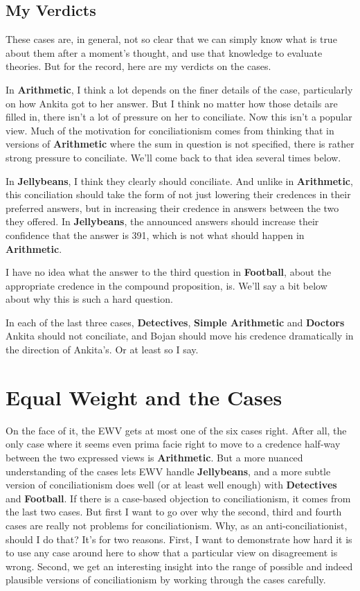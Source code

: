 \documentclass[
  10pt,
  letterpaper,
  twoside]{scrbook}
\begin{document}
\subsection{My Verdicts}\label{myverdicts}

These cases are, in general, not so clear that we can simply know what
is true about them after a moment's thought, and use that knowledge to
evaluate theories. But for the record, here are my verdicts on the
cases.

In \textbf{Arithmetic}, I think a lot depends on the finer details of
the case, particularly on how {Ankita} got to her answer. But I think no
matter how those details are filled in, there isn't a lot of pressure on
her to conciliate. Now this isn't a popular view. Much of the motivation
for conciliationism comes from thinking that in versions of
\textbf{Arithmetic} where the sum in question is not specified, there is
rather strong pressure to conciliate. We'll come back to that idea
several times below.

In \textbf{Jellybeans}, I think they clearly should conciliate. And
unlike in \textbf{Arithmetic}, this conciliation should take the form of
not just lowering their credences in their preferred answers, but in
increasing their credence in answers between the two they offered. In
\textbf{Jellybeans}, the announced answers should increase their
confidence that the answer is 391, which is not what should happen in
\textbf{Arithmetic}.

I have no idea what the answer to the third question in
\textbf{Football}, about the appropriate credence in the compound
proposition, is. We'll say a bit below about why this is such a hard
question.

In each of the last three cases, \textbf{Detectives}, \textbf{Simple
Arithmetic} and \textbf{Doctors} {Ankita} should not conciliate, and
{Bojan} should move his credence dramatically in the direction of
{Ankita}'s. Or at least so I say.

\section{Equal Weight and the Cases}\label{equalweightandthecases}

On the face of it, the EWV gets at most one of the six cases right.
After all, the only case where it seems even prima facie right to move
to a credence half-way between the two expressed views is
\textbf{Arithmetic}. But a more nuanced understanding of the cases lets
EWV handle \textbf{Jellybeans}, and a more subtle version of
conciliationism does well (or at least well enough) with
\textbf{Detectives} and \textbf{Football}. If there is a case-based
objection to conciliationism, it comes from the last two cases. But
first I want to go over why the second, third and fourth cases are
really not problems for conciliationism. Why, as an
anti-conciliationist, should I do that? It's for two reasons. First, I
want to demonstrate how hard it is to use any case around here to show
that a particular view on disagreement is wrong. Second, we get an
interesting insight into the range of possible and indeed plausible
versions of conciliationism by working through the cases carefully.
\end{document}
